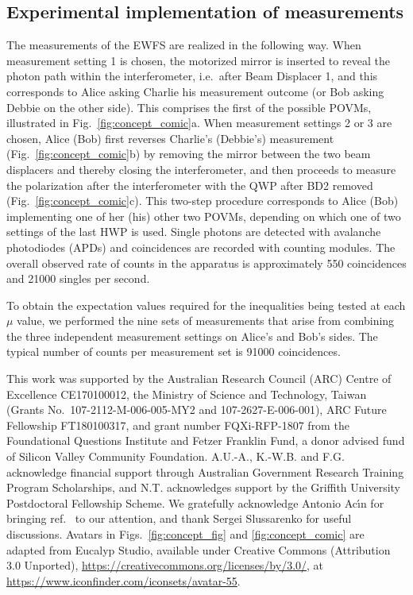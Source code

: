 \documentclass[aps,prx,twocolumn,superscriptaddress]{revtex4-1}
\theoremstyle{plain}
\begin{document}
\subsection{Experimental implementation of measurements}

The measurements of the EWFS are realized in the following way. When measurement setting 1 is chosen, the motorized mirror is inserted to reveal the photon path within the interferometer,  i.e.\ after Beam Displacer 1, and this corresponds to Alice asking Charlie his measurement outcome (or Bob asking Debbie on the other side).  This comprises the first of the possible POVMs, illustrated in Fig.\ \ref{fig:concept_comic}a. When measurement settings 2 or 3 are chosen, Alice (Bob) first reverses Charlie's (Debbie's) measurement (Fig.\ \ref{fig:concept_comic}b) by removing the mirror between the two beam displacers and thereby closing the interferometer, and then proceeds to measure the polarization after the interferometer with the QWP after BD2 removed (Fig.\ \ref{fig:concept_comic}c).  This two-step procedure corresponds to Alice (Bob) implementing one of her (his) other two POVMs, depending on which one of two settings of the last HWP is used. Single photons are detected with avalanche photodiodes (APDs) and coincidences are recorded with counting modules. The overall observed rate of counts in the apparatus is approximately 550 coincidences and 21000 singles per second.

To obtain the expectation values required for the inequalities being tested at each $\mu$ value, we performed the nine sets of measurements that arise from combining the three independent measurement settings on Alice's and Bob's sides. The typical number of counts per measurement set is 91000 coincidences. 

This work was supported by the Australian Research Council (ARC) Centre of Excellence CE170100012, the Ministry of Science and Technology, Taiwan (Grants No.\ 107-2112-M-006-005-MY2 and 107-2627-E-006-001), ARC Future Fellowship FT180100317, and grant number FQXi-RFP-1807 from the Foundational Questions Institute and Fetzer Franklin Fund, a donor advised fund of Silicon Valley Community Foundation. A.U.-A., K.-W.B. and F.G. acknowledge financial support through Australian Government Research Training Program Scholarships, and N.T. acknowledges support by the Griffith
University Postdoctoral Fellowship Scheme. We gratefully acknowledge Antonio Ac\'{\i}n for bringing ref.~\cite{Woodhead2014} to our attention, and thank Sergei Slussarenko for useful discussions. Avatars in Figs.~\ref{fig:concept_fig} and \ref{fig:concept_comic} are adapted from Eucalyp Studio, available under Creative Commons (Attribution 3.0 Unported),  \href{https://creativecommons.org/licenses/by/3.0/}{https://creativecommons.org/licenses/by/3.0/}, at \href{https://www.iconfinder.com/iconsets/avatar-55}{https://www.iconfinder.com/iconsets/avatar-55}.
\end{document}
